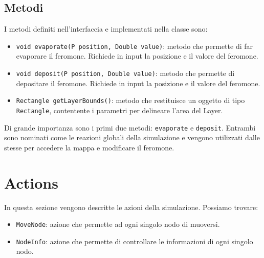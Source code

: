 

\subsection{Metodi}
I metodi definiti nell'interfaccia e implementati nella classe sono:
\begin{itemize}
    \item \texttt{void evaporate(P position, Double value)}: metodo che permette di far evaporare il feromone. 
    Richiede in input la posizione e il valore del feromone.
    \item \texttt{void deposit(P position, Double value)}: metodo che permette di depositare il feromone.
     Richiede in input la posizione e il valore del feromone.
    \item \texttt{Rectangle getLayerBounds()}: metodo che restituisce un oggetto di tipo \texttt{Rectangle}, contentente i parametri per delineare l'area del Layer.
\end{itemize}
Di grande importanza sono i primi due metodi: \texttt{evaporate} e \texttt{deposit}.
Entrambi sono nominati come le reazioni globali della simulazione e vengono utilizzati dalle stesse per accedere la mappa e modificare il feromone.\newline


\section{Actions}
In questa sezione vengono descritte le azioni della simulazione. Possiamo trovare:
\begin{itemize}
    \item \texttt{MoveNode}: azione che permette ad ogni singolo nodo di muoversi.
    \item \texttt{NodeInfo}: azione che permette di controllare le informazioni di ogni singolo nodo.
\end{itemize}


